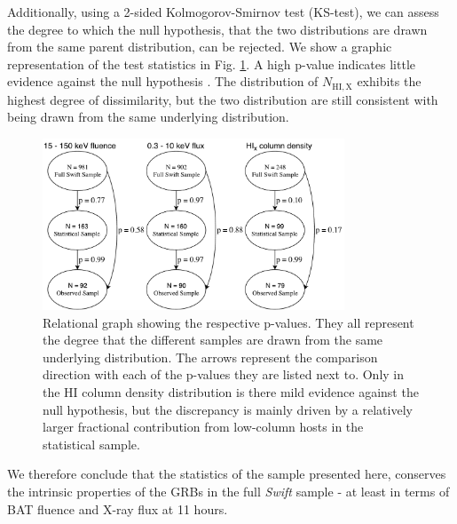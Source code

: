 \documentclass{aa}    %
\begin{document}
Additionally, using a 2-sided Kolmogorov-Smirnov test (KS-test), we can assess
the degree to which the null hypothesis, that the two distributions are drawn
from the same parent distribution, can be rejected. We show a graphic
representation of the test statistics in Fig. \ref{fig:p_values}. A high p-value
indicates little evidence against the null hypothesis . The distribution of
$N_{\mathrm{HI,X}}$ exhibits the highest degree of dissimilarity, but the two
distribution are still consistent with being drawn from the same underlying
distribution.

\begin{figure}
	\centerline{\includegraphics[width=9cm]{figures/XSGRB_p_values.pdf}}
\caption{Relational graph showing the respective p-values. They all represent
	the degree that the different samples are drawn from the same underlying
	distribution. The arrows represent the comparison direction with each of the
	p-values they are listed next to. Only in the H{\sc I} column density distribution is
	there mild evidence against the null hypothesis, but the discrepancy is mainly
	driven by a relatively larger fractional contribution from low-column hosts in
	the statistical sample.} \label{fig:p_values}
\end{figure}

We therefore conclude that the statistics of the sample presented here,
conserves the intrinsic properties of the GRBs in the full \textit{Swift} sample
- at least in terms of BAT fluence and X-ray flux at 11 hours.

\end{document}
